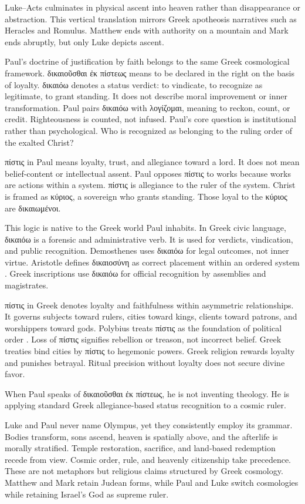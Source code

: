 Luke--Acts culminates in physical ascent into heaven rather than disappearance or abstraction.
This vertical translation mirrors Greek apotheosis narratives such as Heracles and Romulus.
Matthew ends with authority on a mountain and Mark ends abruptly, but only Luke depicts ascent.

Paul's doctrine of justification by faith belongs to the same Greek cosmological framework.
δικαιοῦσθαι ἐκ πίστεως means to be declared in the right on the basis of loyalty.
δικαιόω denotes a status verdict: to vindicate, to recognize as legitimate, to grant standing.
It does not describe moral improvement or inner transformation.
Paul pairs δικαιόω with λογίζομαι, meaning to reckon, count, or credit.
Righteousness is counted, not infused.
Paul's core question is institutional rather than psychological.
Who is recognized as belonging to the ruling order of the exalted Christ?

πίστις in Paul means loyalty, trust, and allegiance toward a lord.
It does not mean belief-content or intellectual assent.
Paul opposes πίστις to works because works are actions within a system.
πίστις is allegiance to the ruler of the system.
Christ is framed as κύριος, a sovereign who grants standing.
Those loyal to the κύριος are δικαιωμένοι.

This logic is native to the Greek world Paul inhabits.
In Greek civic language, δικαιόω is a forensic and administrative verb.
It is used for verdicts, vindication, and public recognition.
Demosthenes uses δικαιόω for legal outcomes, not inner virtue.
Aristotle defines δικαιοσύνη as correct placement within an ordered system \cite[5]{aristotle:ethics}.
Greek inscriptions use δικαιόω for official recognition by assemblies and magistrates.

πίστις in Greek denotes loyalty and faithfulness within asymmetric relationships.
It governs subjects toward rulers, cities toward kings, clients toward patrons, and worshippers toward gods.
Polybius treats πίστις as the foundation of political order \cite{polybius:histories}.
Loss of πίστις signifies rebellion or treason, not incorrect belief.
Greek treaties bind cities by πίστις to hegemonic powers.
Greek religion rewards loyalty and punishes betrayal.
Ritual precision without loyalty does not secure divine favor.

When Paul speaks of δικαιοῦσθαι ἐκ πίστεως, he is not inventing theology.
He is applying standard Greek allegiance-based status recognition to a cosmic ruler.

Luke and Paul never name Olympus, yet they consistently employ its grammar.
Bodies transform, sons ascend, heaven is spatially above, and the afterlife is morally stratified.
Temple restoration, sacrifice, and land-based redemption recede from view.
Cosmic order, rule, and heavenly citizenship take precedence.
These are not metaphors but religious claims structured by Greek cosmology.
Matthew and Mark retain Judean forms, while Paul and Luke switch cosmologies while retaining Israel's God as supreme ruler.

